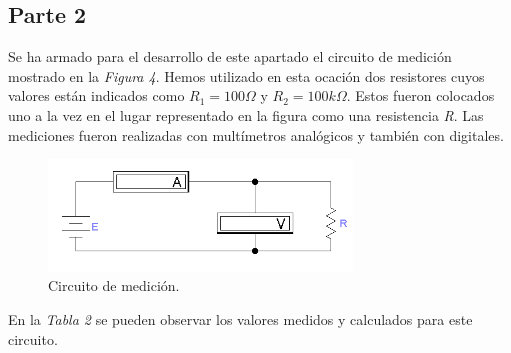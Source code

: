\documentclass{article}
\begin{document}
\subsection{Parte 2}


	Se ha armado para el desarrollo de este apartado el circuito de medición mostrado en la \textit{Figura 4}. Hemos utilizado en esta ocación dos resistores cuyos valores están indicados como \textit{$R_1=100\Omega$} y \textit{$R_2=100k\Omega$}. Estos fueron colocados uno a la vez en el lugar representado en la figura como una resistencia \textit{R}. Las mediciones fueron realizadas con multímetros analógicos y también con digitales.
\bigskip

\begin{figure}[h]
	\centering
	\includegraphics[width=0.72\textwidth]{images/p2-item-a.jpg}
	\caption{Circuito de medición.}
\end{figure}
\bigskip\bigskip


	En la \textit{Tabla 2} se pueden observar los valores medidos y calculados para este circuito.
\bigskip
\end{document}
